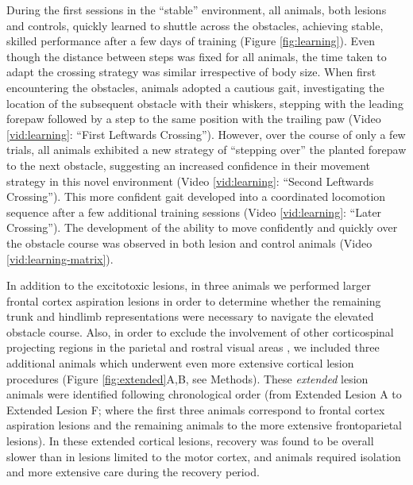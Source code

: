 During the first sessions in the ``stable'' environment, all animals, both lesions and controls, quickly learned to shuttle across the obstacles, achieving stable, skilled performance after a few days of training (Figure \ref{fig:learning}). Even though the distance between steps was fixed for all animals, the time taken to adapt the crossing strategy was similar irrespective of body size. When first encountering the obstacles, animals adopted a cautious gait, investigating the location of the subsequent obstacle with their whiskers, stepping with the leading forepaw followed by a step to the same position with the trailing paw (Video \ref{vid:learning}: ``First Leftwards Crossing''). However, over the course of only a few trials, all animals exhibited a new strategy of ``stepping over'' the planted forepaw to the next obstacle, suggesting an increased confidence in their movement strategy in this novel environment (Video \ref{vid:learning}: ``Second Leftwards Crossing''). This more confident gait developed into a coordinated locomotion sequence after a few additional training sessions (Video \ref{vid:learning}: ``Later Crossing''). The development of the ability to move confidently and quickly over the obstacle course was observed in both lesion and control animals (Video \ref{vid:learning-matrix}).

In addition to the excitotoxic lesions, in three animals we performed larger frontal cortex aspiration lesions in order to determine whether the remaining trunk and hindlimb representations were necessary to navigate the elevated obstacle course. Also, in order to exclude the involvement of other corticospinal projecting regions in the parietal and rostral visual areas \citep{Miller1987}, we included three additional animals which underwent even more extensive cortical lesion procedures (Figure \ref{fig:extended}A,B, see Methods). These \emph{extended} lesion animals were identified following chronological order (from Extended Lesion A to Extended Lesion F; where the first three animals correspond to frontal cortex aspiration lesions and the remaining animals to the more extensive frontoparietal lesions). In these extended cortical lesions, recovery was found to be overall slower than in lesions limited to the motor cortex, and animals required isolation and more extensive care during the recovery period.

